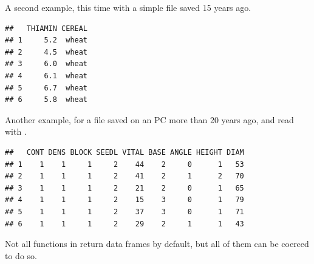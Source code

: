 \documentclass[krantz2]{krantz}\usepackage{knitr}
\begin{document}
A second example, this time with a simple  file saved 15 years ago.

\begin{knitrout}\footnotesize
{}\color{fgcolor}\begin{kframe}
\begin{alltt}
 \hlkwb{<-} \hlstd{(} \hlstd{=} \hlstd{,}  \hlstd{=} \hlstd{)}
\end{alltt}
\begin{verbatim}
##   THIAMIN CEREAL
## 1     5.2  wheat
## 2     4.5  wheat
## 3     6.0  wheat
## 4     6.1  wheat
## 5     6.7  wheat
## 6     5.8  wheat
\end{verbatim}
\end{kframe}
\end{knitrout}

Another example, for a  file saved on an PC more than 20 years ago, and read with .

\begin{knitrout}\footnotesize
{}\color{fgcolor}\begin{kframe}
\begin{alltt}
 \hlkwb{<-} \hlstd{(} \hlstd{=} \hlstd{)}
\end{alltt}
\begin{verbatim}
##   CONT DENS BLOCK SEEDL VITAL BASE ANGLE HEIGHT DIAM
## 1    1    1     1     2    44    2     0      1   53
## 2    1    1     1     2    41    2     1      2   70
## 3    1    1     1     2    21    2     0      1   65
## 4    1    1     1     2    15    3     0      1   79
## 5    1    1     1     2    37    3     0      1   71
## 6    1    1     1     2    29    2     1      1   43
\end{verbatim}
\end{kframe}
\end{knitrout}

Not all functions in  return data frames by default, but all of them can be coerced to do so.

\subsection[haven]{}
\end{document}
